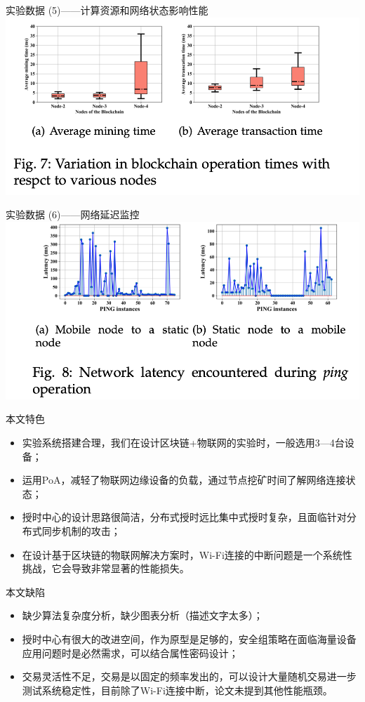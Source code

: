 \documentclass{beamer}
\begin{document}
\begin{frame}{实验数据 (5)——计算资源和网络状态影响性能}
	\includegraphics[width=\linewidth]{Assets/图7}
\end{frame}

\begin{frame}{实验数据 (6)——网络延迟监控}
	\includegraphics[width=\linewidth]{Assets/图8}
\end{frame}

\begin{frame}{本文特色}
	\begin{itemize}
		\item 实验系统搭建合理，我们在设计区块链+物联网的实验时，一般选用3—4台设备；
		\item 运用PoA，减轻了物联网边缘设备的负载，通过节点挖矿时间了解网络连接状态；
		\item 授时中心的设计思路很简洁，分布式授时远比集中式授时复杂，且面临针对分布式同步机制的攻击；
		\item 在设计基于区块链的物联网解决方案时，Wi-Fi连接的中断问题是一个系统性挑战，它会导致非常显著的性能损失。
	\end{itemize}
\end{frame}

\begin{frame}{本文缺陷}
	\begin{itemize}
		\item 缺少算法复杂度分析，缺少图表分析（描述文字太多）；
		\item 授时中心有很大的改进空间，作为原型是足够的，安全组策略在面临海量设备应用问题时是必然需求，可以结合属性密码设计；
		\item 交易灵活性不足，交易是以固定的频率发出的，可以设计大量随机交易进一步测试系统稳定性，目前除了Wi-Fi连接中断，论文未提到其他性能瓶颈。
	\end{itemize}
\end{frame}
\end{document}
